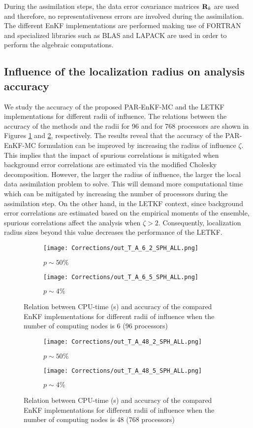 \documentclass[12pt]{article}
\newcommand{\ra}{\zeta}
\begin{document}
During the assimilation steps, the data error covariance matrices ${\bf R}_k$ are used and therefore, no representativeness errors are involved during the assimilation. The different EnKF implementations are performed making use of FORTRAN and specialized libraries such as BLAS and LAPACK are used in order to perform the algebraic computations. 

\subsection{Influence of the  localization radius on analysis accuracy}
\label{subsec:accuracy-of-proposed-method}
We study the accuracy of the proposed PAR-EnKF-MC and the LETKF implementations for different radii of influence. The relations between the accuracy of the methods and the radii for 96 and for 768 processors are shown in Figures \ref{fig:all-16} and \ref{fig:all-48}, respectively. The results reveal that the accuracy of the PAR-EnKF-MC formulation can be improved by increasing the radius of influence $\ra$. This implies that the impact of spurious correlations is mitigated when background error correlations are estimated via the modified Cholesky decomposition. However, the larger the radius of influence, the larger the local data assimilation problem to solve. This will demand more computational time which can be mitigated by increasing the number of processors during the assimilation step. On the other hand, in the LETKF context, since background error correlations are estimated based on the empirical moments of the ensemble, spurious correlations affect the analysis when $\ra>2$. Consequently, localization radius sizes beyond this value decreases the performance of the LETKF. 
\begin{figure}[H]
\centering
\begin{subfigure}{0.5\textwidth}
\centering
\texttt{[image: Corrections/out\_T\_A\_6\_2\_SPH\_ALL.png]}
\caption{$p \sim 50 \%$}
\end{subfigure}\begin{subfigure}{0.5\textwidth}
\centering
\texttt{[image: Corrections/out\_T\_A\_6\_5\_SPH\_ALL.png]}
\caption{$p \sim 4 \%$}
\end{subfigure}\caption{Relation between CPU-time (s) and accuracy of the compared EnKF implementations for different radii of influence when the number of computing nodes is 6 (96 processors)}
\label{fig:all-16}
\end{figure}


\begin{figure}[H]
\centering
\begin{subfigure}{0.5\textwidth}
\centering
\texttt{[image: Corrections/out\_T\_A\_48\_2\_SPH\_ALL.png]}
\caption{$p \sim 50 \%$}
\end{subfigure}\begin{subfigure}{0.5\textwidth}
\centering
\texttt{[image: Corrections/out\_T\_A\_48\_5\_SPH\_ALL.png]}
\caption{$p \sim 4 \%$}
\end{subfigure}\caption{Relation between CPU-time (s) and accuracy of the compared EnKF implementations for different radii of influence when the number of computing nodes is 48 (768 processors)}
\label{fig:all-48}
\end{figure}
\end{document}

